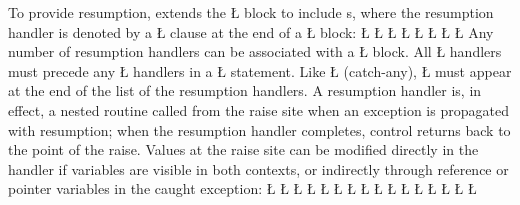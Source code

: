 \documentclass[openright,twoside]{report}
\begin{document}
To provide resumption, \uC extends the \LGinlinetrue\LGbegin\lgrinde\L{}\endlgrinde\LGend{} block to include s, where the resumption handler is denoted by a \LGinlinetrue\LGbegin\lgrinde\L{}\endlgrinde\LGend{} clause at the end of a \LGinlinetrue\LGbegin\lgrinde\L{}\endlgrinde\LGend{} block:
\LGinlinefalse\LGbegin\lgrinde
\L{}
\L{\LB{}}
\L{\LB{\}}}
\CE{}\L{\LB{}}
\CE{}\L{\LB{}}
\CE{}\L{\LB{}}
\CE{}\L{\LB{}}
\CE{}\L{\LB{}}
\CE{}\endlgrinde\LGend
Any number of resumption handlers can be associated with a \LGinlinetrue\LGbegin\lgrinde\L{}\endlgrinde\LGend{} block.
All \LGinlinetrue\LGbegin\lgrinde\L{}\endlgrinde\LGend{} handlers must precede any \LGinlinetrue\LGbegin\lgrinde\L{}\endlgrinde\LGend{} handlers in a \LGinlinetrue\LGbegin\lgrinde\L{}\endlgrinde\LGend{} statement.
Like \LGinlinetrue\LGbegin\lgrinde\L{}\endlgrinde\LGend{} (catch-any), \LGinlinetrue\LGbegin\lgrinde\L{}\endlgrinde\LGend{} must appear at the end of the list of the resumption handlers.
A resumption handler is, in effect, a nested routine called from the raise site when an exception is propagated with resumption;
when the resumption handler completes, control returns back to the point of the raise.
Values at the raise site can be modified directly in the handler if variables are visible in both contexts, or indirectly through reference or pointer variables in the caught exception:
\LGinlinefalse\LGbegin\lgrinde
\L{}
\L{}
\L{\LB{}}
\CE{}\L{\LB{}}
\L{\LB{\};}}
\L{}
\L{\LB{\0}}
\L{\LB{}}
\CE{}\L{\LB{\}}}
\L{}
\L{\LB{}}
\L{\LB{}}
\L{\LB{}}
\L{\LB{}}
\CE{}\L{\LB{}}
\L{\LB{\}}}
\endlgrinde\LGend
\end{document}
